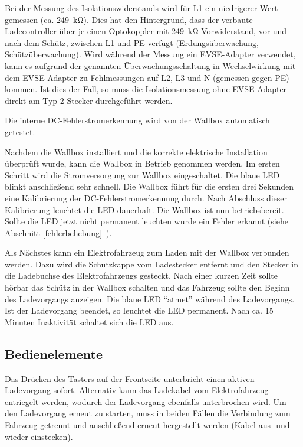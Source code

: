 \documentclass[a4paper,10pt]{article}
\newcommand*{\fullref}[1]{Abschnitt \hyperref[{#1}]{\ref*{#1}~\nameref*{#1}}}
\begin{document}
\begin{multicols*}{2}
    Bei der Messung des Isolationswiderstands wird für L1 ein niedrigerer Wert
    gemessen (ca. \SI{249}{\kilo\ohm}). Dies hat den Hintergrund, dass
    der verbaute Ladecontroller über je einen Optokoppler mit
    \SI{249}{\kilo\ohm} Vorwiderstand, vor und nach dem Schütz, zwischen L1 und
    PE verfügt (Erdungsüberwachung, Schützüberwachung). Wird während der Messung ein EVSE-Adapter verwendet,
    kann es aufgrund der genannten Überwachungsschaltung in Wechselwirkung mit dem EVSE-Adapter zu Fehlmessungen
    auf L2, L3 und N (gemessen gegen PE) kommen. Ist dies der Fall, so muss die Isolationsmessung
    ohne EVSE-Adapter direkt am Typ-2-Stecker durchgeführt werden.

    Die interne DC-Fehlerstromerkennung wird von der Wallbox automatisch getestet.

    Nachdem die Wallbox installiert
    und die korrekte elektrische Installation überprüft wurde, kann die Wallbox in
    Betrieb genommen werden.
    Im ersten Schritt wird die Stromversorgung zur Wallbox eingeschaltet. Die
    blaue LED blinkt anschließend sehr schnell. Die Wallbox führt
    für die ersten drei Sekunden eine Kalibrierung der
    DC-Fehlerstromerkennung durch. Nach Abschluss dieser Kalibrierung
    leuchtet die LED dauerhaft. Die Wallbox ist nun betriebsbereit. Sollte die LED jetzt
    nicht permanent leuchten wurde ein Fehler erkannt (siehe \fullref{fehlerbehebung}).

    Als Nächstes kann ein Elektrofahrzeug zum Laden mit der Wallbox verbunden
    werden. Dazu wird die Schutzkappe vom Ladestecker entfernt und den Stecker in die
    Ladebuchse des Elektrofahrzeugs gesteckt. Nach einer kurzen Zeit sollte hörbar
    das Schütz in der Wallbox schalten und das Fahrzeug sollte den Beginn
    des Ladevorgangs anzeigen. Die blaue LED \enquote{atmet} während des
    Ladevorgangs. Ist der Ladevorgang beendet, so leuchtet die LED permanent. Nach ca.
    15 Minuten Inaktivität schaltet sich die LED aus.

    \subsection{Bedienelemente}\label{lockswitch}
    Das Drücken des Tasters auf der Frontseite unterbricht einen aktiven Ladevorgang
    sofort. Alternativ kann das Ladekabel vom Elektrofahrzeug entriegelt werden,
    wodurch der Ladevorgang ebenfalls unterbrochen wird. Um den Ladevorgang erneut
    zu starten, muss in beiden Fällen die Verbindung zum Fahrzeug getrennt und
    anschließend erneut hergestellt werden (Kabel aus- und wieder einstecken).


\end{multicols*}
\end{document}
